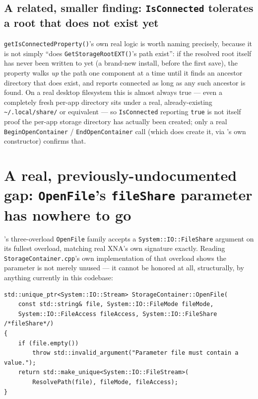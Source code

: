 \subsection{A related, smaller finding: \texttt{IsConnected} tolerates a root that does not exist yet}

\texttt{getIsConnectedProperty()}'s own real logic is worth naming precisely, because it is not
simply ``does \texttt{GetStorageRootEXT()}'s path exist'': if the resolved root itself has never
been written to yet (a brand-new install, before the first save), the property walks \emph{up}
the path one component at a time until it finds an ancestor directory that does exist, and
reports connected as long as any such ancestor is found. On a real desktop filesystem this is
almost always true --- even a completely fresh per-app directory sits under a real, already-existing
\texttt{\textasciitilde/.local/share/} or equivalent --- so \texttt{IsConnected} reporting
\texttt{true} is not itself proof the per-app storage directory has actually been created; only
a real \texttt{BeginOpenContainer} / \texttt{EndOpenContainer} call (which does create it, via
's own constructor) confirms that.

\section{A real, previously-undocumented gap: \texttt{OpenFile}'s \texttt{fileShare} parameter has nowhere to go}

's three-overload \texttt{OpenFile} family accepts a
\texttt{System::IO::FileShare} argument on its fullest overload, matching real XNA's own
signature exactly. Reading \texttt{StorageContainer.cpp}'s own implementation of that overload
shows the parameter is not merely unused --- it cannot be honored at all, structurally, by
anything currently in this codebase:

\begin{lstlisting}
std::unique_ptr<System::IO::Stream> StorageContainer::OpenFile(
    const std::string& file, System::IO::FileMode fileMode,
    System::IO::FileAccess fileAccess, System::IO::FileShare /*fileShare*/)
{
    if (file.empty())
        throw std::invalid_argument("Parameter file must contain a value.");
    return std::make_unique<System::IO::FileStream>(
        ResolvePath(file), fileMode, fileAccess);
}
\end{lstlisting}

